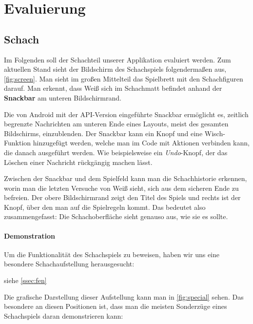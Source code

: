 \chapter{Evaluierung}

\section{Schach}
\sectionauthor{\frank}

Im Folgenden soll der Schachteil unserer Applikation evaluiert werden. Zum
aktuellen Stand sieht der Bildschirm des Schachspiels folgendermaßen aus,
\autoref{fig:screen}. Man sieht im großen Mittelteil das Spielbrett mit den
Schachfiguren darauf. Man erkennt, dass Weiß sich im Schachmatt befindet anhand
der \textbf{Snackbar} am unteren Bildschirmrand.

\begin{infobox}[frametitle=Snackbar]
Die von Android mit der API-Version eingeführte Snackbar ermöglicht es,
zeitlich begrenzte Nachrichten am unteren Ende eines Layouts, meist des
gesamten Bildschirms, einzublenden. Der Snackbar kann ein Knopf und eine
Wisch-Funktion hinzugefügt werden, welche man im Code mit Aktionen verbinden
kann, die danach ausgeführt werden. Wie beispielsweise ein \emph{Undo}-Knopf,
der das Löschen einer Nachricht rückgängig machen lässt.
\end{infobox}

Zwischen der Snackbar und dem Spielfeld kann man die Schachhistorie erkennen,
worin man die letzten Versuche von Weiß sieht, sich aus dem sicheren Ende zu
befreien. Der obere Bildschirmrand zeigt den Titel des Spiels und rechts ist der
Knopf, über den man auf die Spielregeln kommt. Das bedeutet also
zusammengefasst: Die Schachoberfläche sieht genauso aus, wie sie es sollte.

\subsubsection{Demonstration}

Um die Funktionalität des Schachspiels zu beweisen, haben wir uns eine besondere
Schachaufstellung herausgesucht:

 siehe \autoref{ssec:fen}

Die grafische Darstellung dieser Aufstellung kann man in \autoref{fig:special}
sehen. Das besondere an diesen Positionen ist, dass man die meisten Sonderzüge
eines Schachspiels daran demonstrieren kann:

